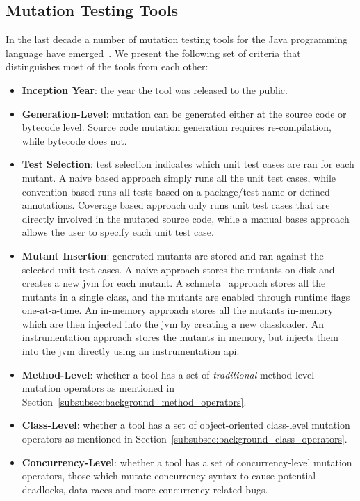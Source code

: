 \subsection{Mutation Testing Tools}
\label{subsec:background_mutation_tools}
In the last decade a number of mutation testing tools for the Java programming language have emerged~\cite{JH10}. We present the following set of criteria that distinguishes most of the tools from each other:

\begin{itemize}
  \item \textbf{Inception Year}: the year the tool was released to the public.
  \item \textbf{Generation-Level}: mutation can be generated either at the source code or bytecode level. Source code mutation generation requires re-compilation, while bytecode does not.
  \item \textbf{Test Selection}: test selection indicates which unit test cases are ran for each mutant. A naive based approach simply runs all the unit test cases, while convention based runs all tests based on a package/test name or defined annotations. Coverage based approach only runs unit test cases that are directly involved in the mutated source code, while a manual bases approach allows the user to specify each unit test case.
  \item \textbf{Mutant Insertion}: generated mutants are stored and ran against the selected unit test cases. A naive approach stores the mutants on disk and creates a new \gls{jvm} for each mutant. A schmeta~\cite{UOH93} approach stores all the mutants in a single class, and the mutants are enabled through runtime flags one-at-a-time. An in-memory approach stores all the mutants in-memory which are then injected into the \gls{jvm} by creating a new classloader. An instrumentation approach stores the mutants in memory, but injects them into the \gls{jvm} directly using an instrumentation \gls{api}.
  \item \textbf{Method-Level}: whether a tool has a set of \emph{traditional} method-level mutation operators as mentioned in Section~\ref{subsubsec:background_method_operators}.
  \item \textbf{Class-Level}: whether a tool has a set of object-oriented class-level mutation operators as mentioned in Section~\ref{subsubsec:background_class_operators}.
  \item \textbf{Concurrency-Level}: whether a tool has a set of concurrency-level mutation operators, those which mutate concurrency syntax to cause potential deadlocks, data races and more concurrency related bugs.

\end{itemize}
